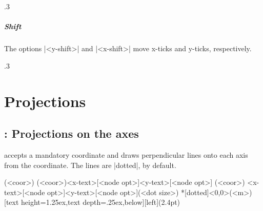\begin{tzcode}{.3}
\end{tzcode}

\paragraph{Shift}
The options |<y-shift>| and |<x-shift>| move x-ticks and y-ticks, respectively.

\begin{tzcode}{.3}
\end{tzcode}




\chapter{Projections}
\label{c:projections}

\section{\protect\cmd{\tzproj(*)}: Projections on the axes}
\label{s:tzproj}

\icmd{\tzproj} accepts a mandatory coordinate and draws perpendicular lines onto each axis from the coordinate. The lines are |dotted|, by default.

\begin{tzdef}{}
\tzproj(<coor>)
\tzproj*(<coor>){<x-text>}[<node opt>]{<y-text>}[<node opt>]
(<coor>)
        {<x-text>}[<node opt>]{<y-text>}[<node opt>](<dot size>)
 *[dotted]<0,0>(<m>){}[text height=1.25ex,text depth=.25ex,below]{}[left](2.4pt)
\end{tzdef}

